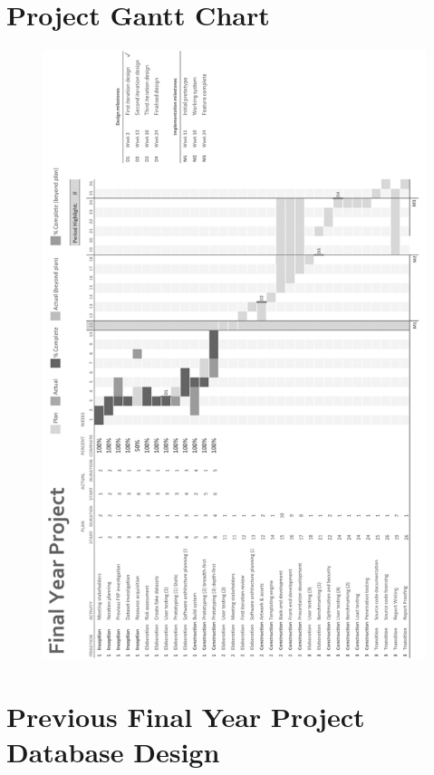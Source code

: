 \newpage
\section{Project Gantt Chart}
\label{appendix:project-gantt-chart}

\begin{figure}[H]
  \centering
  \includegraphics{assets/gantt-plan.png}
\end{figure}

\newpage
\section{Previous Final Year Project Database Design}
\label{appendix:previous-fyp-uml}

